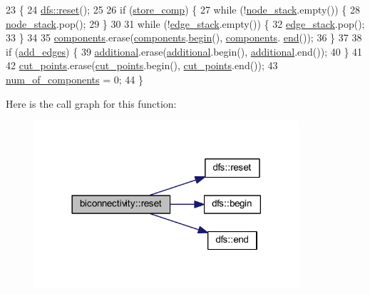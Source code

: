 \begin{DoxyCode}
23 \{
24     \mbox{\hyperlink{classdfs_affaffda8be8418d6dbf396c5b1d6b81a}{dfs::reset}}();
25 
26     \textcolor{keywordflow}{if} (\mbox{\hyperlink{classbiconnectivity_a989307b07f4a976649bd7551173bd564}{store\_comp}}) \{
27         \textcolor{keywordflow}{while} (!\mbox{\hyperlink{classbiconnectivity_a1223b0d8a833eb6299e82290b3e8ac8f}{node\_stack}}.empty()) \{
28             \mbox{\hyperlink{classbiconnectivity_a1223b0d8a833eb6299e82290b3e8ac8f}{node\_stack}}.pop();
29         \}
30 
31         \textcolor{keywordflow}{while} (!\mbox{\hyperlink{classbiconnectivity_a524ba263fc35d13aab5078ebfe8f5307}{edge\_stack}}.empty()) \{
32             \mbox{\hyperlink{classbiconnectivity_a524ba263fc35d13aab5078ebfe8f5307}{edge\_stack}}.pop();
33         \}
34 
35         \mbox{\hyperlink{classcomponents}{components}}.erase(\mbox{\hyperlink{classcomponents}{components}}.\mbox{\hyperlink{classdfs_ab06650dd8cbd5e76b0c73b71458ec5ec}{begin}}(), \mbox{\hyperlink{classcomponents}{components}}.
      \mbox{\hyperlink{classdfs_af847633fa642258d3522e8deb26aef37}{end}}());
36     \}
37 
38     \textcolor{keywordflow}{if} (\mbox{\hyperlink{classbiconnectivity_a70c1310b4ba83dbe10594f3a33f94763}{add\_edges}}) \{
39         \mbox{\hyperlink{classbiconnectivity_ad5393f67b9526964db540fc63745318f}{additional}}.erase(\mbox{\hyperlink{classbiconnectivity_ad5393f67b9526964db540fc63745318f}{additional}}.begin(), \mbox{\hyperlink{classbiconnectivity_ad5393f67b9526964db540fc63745318f}{additional}}.end());
40     \}
41 
42     \mbox{\hyperlink{classbiconnectivity_a776f4f2d5654ef6836aeb34690fdadc5}{cut\_points}}.erase(\mbox{\hyperlink{classbiconnectivity_a776f4f2d5654ef6836aeb34690fdadc5}{cut\_points}}.begin(), \mbox{\hyperlink{classbiconnectivity_a776f4f2d5654ef6836aeb34690fdadc5}{cut\_points}}.end());
43     \mbox{\hyperlink{classbiconnectivity_a89fbd540b8a61aad150020be657ddfb7}{num\_of\_components}} = 0;
44 \}
\end{DoxyCode}
Here is the call graph for this function\+:\nopagebreak
\begin{figure}[H]
\begin{center}
\leavevmode
\includegraphics[width=278pt]{classbiconnectivity_a4393dd1e626887472f6967722349abc6_cgraph}
\end{center}
\end{figure}
\mbox{\label{classdfs_af56fa2b736f0b924dba1257e18ba4b61}} 
